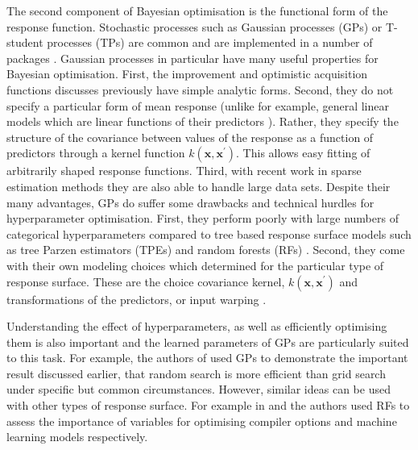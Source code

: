 The second component of Bayesian optimisation is the functional form of the response function. Stochastic processes such as Gaussian processes (GPs) or T-student processes (TPs) \cite{rasmussenGaussianProcessesMachine2006} are common and are implemented in a number of packages \cite{martinez-cantinBayesOptBayesianOptimization2014}\cite{NIPS2012_4522}\cite{gpyopt2016}\cite{JMLR:v21:18-223}\cite{mcgibbonOspreyHyperparameterOptimization2016a}\cite{liuAuptimizerExtensibleOpenSource2019}. Gaussian processes in particular have many useful properties for Bayesian optimisation. \cite{feurer2019hyperparameter}\cite{brochuTutorialBayesianOptimization2010}\cite{jonesEfficientGlobalOptimization1998}  First, the improvement and optimistic acquisition functions discusses previously have simple analytic forms.\cite{brochuTutorialBayesianOptimization2010} Second, they do not specify a particular form of mean response (unlike for example, general linear models which are linear functions of their predictors \cite{nelder1972generalized}). Rather, they specify the structure of the covariance between values of the response as a function of predictors through a kernel function $k(\mathbf{x}, \mathbf{x}^{\prime})$. \cite{rasmussenGaussianProcessesMachine2006} This allows easy fitting of arbitrarily shaped response functions.  Third, with recent work in sparse estimation methods they are also able to handle large data sets.\cite{quinonero-candelaUnifyingViewSparse2005} Despite their many advantages, GPs do suffer some drawbacks and technical hurdles for hyperparameter optimisation. First, they perform poorly with large numbers of categorical hyperparameters \cite{eggensperger2013towards} compared to tree based response surface models such as tree Parzen estimators (TPEs) \cite{bergstraAlgorithmsHyperParameterOptimizationa} and random forests (RFs) \cite{hutterSequentialModelbasedOptimization2011}\cite{breiman2001}.  Second, they come with their own modeling choices which determined for the particular type of response surface.\cite{rasmussenGaussianProcessesMachine2006}  These are the choice covariance kernel, $k(\mathbf{x}, \mathbf{x}^{\prime})$ and transformations of the predictors, or input warping \cite{snoekInputWarpingBayesian2014a}. 

Understanding the effect of hyperparameters, as well as efficiently optimising them is also important and the learned parameters of GPs are particularly suited to this task.\cite{rasmussenGaussianProcessesMachine2006} For example, the authors of \cite{bergstrajamesbergstraRandomSearchHyperParameter2012} used GPs to demonstrate the important result discussed earlier, that random search is more efficient than grid search under specific but common circumstances. However, similar ideas can be used with other types of response surface. For example in  \cite{gramacyVariableSelectionSensitivity2013} and \cite{pmlr-v32-hutter14} the authors used  RFs to assess the importance of variables for optimising compiler options and machine learning models respectively. 

